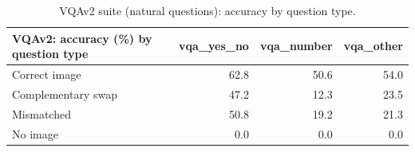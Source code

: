 \begin{table}[t]
\centering\small
\begin{tabular}{lrrr}
\toprule
VQAv2: accuracy (\%) by question type & vqa\_yes\_no & vqa\_number & vqa\_other \\
\midrule
Correct image & 62.8 & 50.6 & 54.0 \\
Complementary swap & 47.2 & 12.3 & 23.5 \\
Mismatched & 50.8 & 19.2 & 21.3 \\
No image & 0.0 & 0.0 & 0.0 \\
\bottomrule
\end{tabular}
\caption{VQAv2 suite (natural questions): accuracy by question type.}
\label{tab:task2_vqav2_suite_types}
\end{table}
